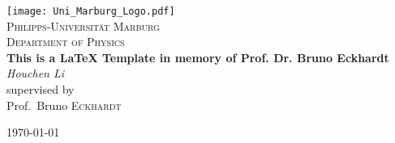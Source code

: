 \documentclass[11pt,a4paper,twoside,openright]{report}
\begin{document}
\begin{titlepage}
\centering
\texttt{[image: Uni\_Marburg\_Logo.pdf]}\\
\vspace{1cm}
{\scshape\LARGE Philipps-Universit\"at Marburg}\\
\vspace{1cm}
{\scshape\Large Department of Physics}\\
\vspace{2cm}
{\huge\bfseries This is a \LaTeX{} Template in memory of Prof. Dr. Bruno Eckhardt}\\
\vfill
{\Large\itshape Houchen Li}\\
\vspace{2cm}
supervised by\\
Prof.~Bruno \textsc{Eckhardt}\\
\vspace{2cm}
{\large \today\par}
\end{titlepage}
\end{document}
